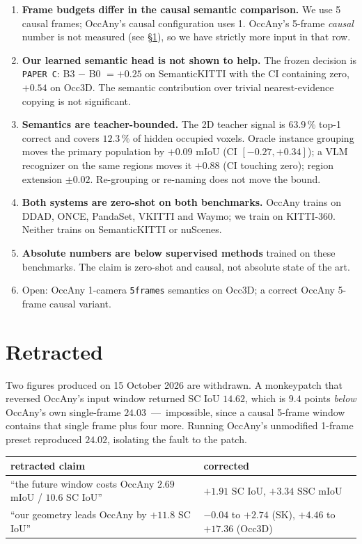 \documentclass[11pt,a4paper]{article}
\newcommand{\nm}{\,---\,}
\begin{document}
\begin{enumerate}\itemsep2pt
  \item \textbf{Frame budgets differ in the causal semantic comparison.} We use 5 causal frames; OccAny's
        causal configuration uses 1. OccAny's 5-frame \emph{causal} number is not measured (see
        \S\ref{sec:retracted}), so we have strictly more input in that row.
  \item \textbf{Our learned semantic head is not shown to help.} The frozen decision is
        \texttt{PAPER C}: B3 $-$ B0 $=+0.25$ on SemanticKITTI with the CI containing zero, $+0.54$ on
        Occ3D. The semantic contribution over trivial nearest-evidence copying is not significant.
  \item \textbf{Semantics are teacher-bounded.} The 2D teacher signal is $63.9\,\%$ top-1 correct and
        covers $12.3\,\%$ of hidden occupied voxels. Oracle instance grouping moves the primary
        population by $+0.09$ mIoU (CI $[-0.27,+0.34]$); a VLM recognizer on the same regions moves it
        $+0.88$ (CI touching zero); region extension $\pm0.02$. Re-grouping or re-naming does not move
        the bound.
  \item \textbf{Both systems are zero-shot on both benchmarks.} OccAny trains on DDAD, ONCE, PandaSet,
        VKITTI and Waymo; we train on KITTI-360. Neither trains on SemanticKITTI or nuScenes.
  \item \textbf{Absolute numbers are below supervised methods} trained on these benchmarks. The claim is
        zero-shot and causal, not absolute state of the art.
  \item Open: OccAny 1-camera \texttt{5frames} semantics on Occ3D; a correct OccAny 5-frame causal variant.
\end{enumerate}

\section{Retracted}\label{sec:retracted}

Two figures produced on 15 October 2026 are withdrawn. A monkeypatch that reversed OccAny's input window
returned SC IoU $14.62$, which is $9.4$ points \emph{below} OccAny's own single-frame $24.03$ \nm
impossible, since a causal 5-frame window contains that single frame plus four more. Running OccAny's
unmodified 1-frame preset reproduced $24.02$, isolating the fault to the patch.

\begin{center}
\begin{tabular}{ll}
\toprule
retracted claim & corrected \\
\midrule
``the future window costs OccAny $2.69$ mIoU / $10.6$ SC IoU'' & $+1.91$ SC IoU, $+3.34$ SSC mIoU \\
``our geometry leads OccAny by $+11.8$ SC IoU'' & $-0.04$ to $+2.74$ (SK), $+4.46$ to $+17.36$ (Occ3D) \\
\bottomrule
\end{tabular}
\end{center}
\end{document}
